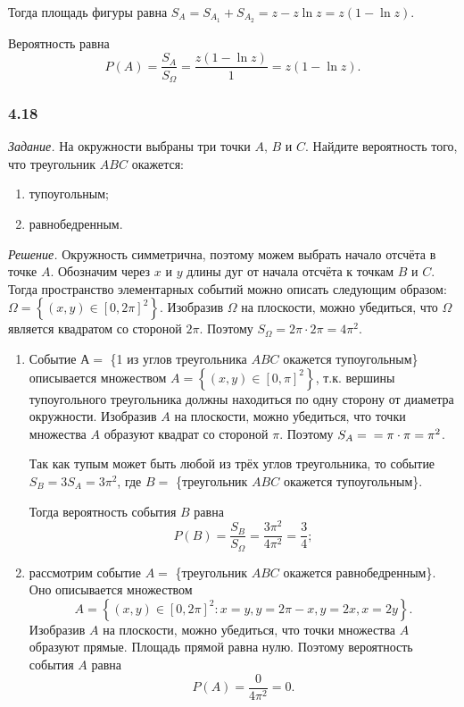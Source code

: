 \begin{enumerate}[label=\alph*)]
Тогда площадь фигуры равна $S_A = S_{A_1} + S_{A_2} = z - z \ln z = z \left( 1 - \ln z \right)$.

Вероятность равна
$$P \left( A \right) =
\frac{S_A}{S_{ \Omega }} =
\frac{z \left( 1 - \ln z \right) }{1} =
z \left( 1 - \ln z \right).$$
\end{enumerate}

\subsubsection*{4.18}

\textit{Задание.} На окружности выбраны три точки $A, \, B$ и $C$.
Найдите вероятность того, что треугольник $ABC$ окажется:
\begin{enumerate}[label=\alph*)]
\item тупоугольным;
\item равнобедренным.
\end{enumerate}

\textit{Решение.} Окружность симметрична, поэтому можем выбрать начало отсчёта в точке $A$.
Обозначим через $x$ и $y$ длины дуг от начала отсчёта к точкам $B$ и $C$.
Тогда пространство элементарных событий можно описать следующим образом:
$ \Omega =
\left\{  \left( x, y \right) \in \left[0, 2 \pi \right]^2 \right\}$.
Изобразив $ \Omega $ на плоскости, можно убедиться, что $ \Omega $ является квадратом со стороной $2 \pi$.
Поэтому $S_{ \Omega } = 2 \pi \cdot 2 \pi = 4 \pi^2$.

\begin{enumerate}[label=\alph*)]
\item Событие $А = $ \{1 из углов треугольника $ABC$ окажется тупоугольным\} описывается множеством
$A =
\left\{ \left( x, y \right) \in \left[0, \pi \right]^2 \right\}$,
т.к. вершины тупоугольного треугольника должны находиться по одну сторону от диаметра окружности.
Изобразив $A$ на плоскости, можно убедиться, что точки множества $A$ образуют квадрат со стороной $ \pi $.
Поэтому $S_A = \\ = \pi \cdot \pi = \pi^2$.

Так как тупым может быть любой из трёх углов треугольника,
то событие $S_B = 3S_A = 3 \pi^2$, где $B =$ \{треугольник $ABC$ окажется тупоугольным\}.

Тогда вероятность события $B$ равна
$$P \left( B \right) =
\frac{S_B}{S_{ \Omega }} =
\frac{3 \pi^2}{4 \pi^2} =
\frac{3}{4};$$

\item рассмотрим событие $A = $ \{треугольник $ABC$ окажется равнобедренным\}.
Оно описывается множеством 
$$A = \left\{ \left( x, y \right) \in \left[0, 2 \pi \right]^2: x = y, y = 2 \pi - x, y = 2x, x = 2y \right\}.$$
Изобразив $A$ на плоскости, можно убедиться, что точки множества $A$ образуют прямые.
Площадь прямой равна нулю.
Поэтому вероятность события $A$ равна
$$P \left( A \right) =
\frac{0}{4 \pi^2} =
0.$$
\end{enumerate}

